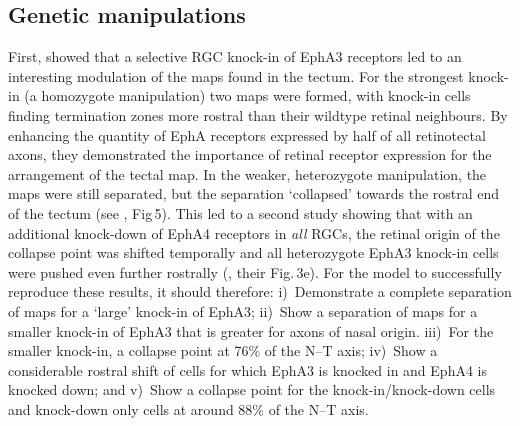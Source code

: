 \documentclass[9pt]{elife} %
\begin{document}
\subsection*{Genetic manipulations}


First, \citet{brown_topographic_2000} showed that a selective RGC knock-in of EphA3 receptors led to an interesting modulation of the maps found in the tectum.
For the strongest knock-in (a homozygote manipulation) two maps were formed, with knock-in cells finding termination zones more rostral than their wildtype retinal neighbours.
By enhancing the quantity of EphA receptors expressed by half of all retinotectal axons, they demonstrated the importance of retinal receptor expression for the arrangement of the tectal map.
In the weaker, heterozygote manipulation, the maps were still separated, but the separation `collapsed' towards the rostral end of the tectum (see \citet{brown_topographic_2000}, Fig\,5).
This led to a second study showing that with an additional knock-down of EphA4 receptors in \emph{all} RGCs, the retinal origin of the collapse point was shifted temporally and all heterozygote EphA3 knock-in cells were pushed even further rostrally (\citet{reber_relative_2004}, their Fig.\,3e).
For the model to successfully reproduce these results, it should therefore: i)~Demonstrate a complete separation of maps for a `large' knock-in of EphA3; ii)~Show a separation of maps for a smaller knock-in of EphA3 that is greater for axons of nasal origin. iii)~For the smaller knock-in, a collapse point at 76\% of the N--T axis; iv)~Show a considerable rostral shift of cells for which EphA3 is knocked in and EphA4 is knocked down; and v)~Show a collapse point for the knock-in/knock-down cells and knock-down only cells at around 88\% of the N--T axis.
\end{document}
